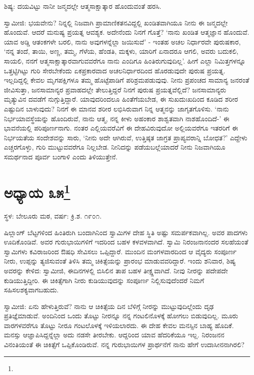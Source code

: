 ಶಿಷ್ಯ: ದಯವಿಟ್ಟು ನಾನೀ ಜನ್ಮದಲ್ಲೇ ಆತ್ಮಸಾಕ್ಷಾತ್ಕಾರ ಹೊಂದುವಂತೆ ಹರಸಿ.

ಸ್ವಾಮೀಜಿ: ಭಯವೇನು? ನಿನ್ನಲ್ಲಿ ನಿಜವಾಗಿ ಪ್ರಾಮಾಣಿಕತನವಿದ್ದಲ್ಲಿ ಖಂಡಿತವಾಗಿಯೂ ನೀನು ಈ ಜನ್ಮದಲ್ಲೇ ಹೊಂದುವೆ. ಆದರೆ ಮನುಷ್ಯ ಪ್ರಯತ್ನ ಆವಶ್ಯಕ. ಅದೇನೆಂದು ನಿನಗೆ ಗೊತ್ತೆ? ‘ನಾನು ಖಂಡಿತ ಆತ್ಮಜ್ಞಾನ ಹೊಂದುವೆ. ಯಾವ ಅಡ್ಡಿ ಆತಂಕಗಳೇ ಬರಲಿ, ನಾನು ಅವುಗಳನ್ನೆಲ್ಲಾ ಜಯಿಸುವೆ’ - ಇಂತಹ ಅಚಲ ನಿರ್ಧಾರವೇ ಪುರುಷಕಾರ, ‘ನನ್ನ ತಂದೆ, ತಾಯಿ, ಅಣ್ಣ, ತಮ್ಮ, ಗೆಳೆಯ, ಹೆಂಡತಿ, ಮಕ್ಕಳು, ಯಾರಿಗೆ ಏನಾದರೂ ಆಗಲಿ, ಅವರು ಬದುಕಲಿ, ಸಾಯಲಿ, ನನಗೆ ಆತ್ಮಸಾಕ್ಷಾತ್ಕಾರವಾಗುವವರೆಗೂ ನಾನು ಎಂದಿಗೂ ಹಿಂತಿರುಗುವುದಿಲ್ಲ’. ಹೀಗೆ ಎಲ್ಲಾ ನಿಮಿತ್ತಗಳನ್ನೂ ಒತ್ತಟ್ಟಿಗಿಟ್ಟು ಗುರಿ ಸೇರಬೇಕೆಂದು ಏಕಪ್ರಕಾರವಾದ ಅಚಲನಿರ್ಧಾರದಿಂದ ಹೊರಡುವುದೇ ಪುರುಷ ಪ್ರಯತ್ನ. ಇಲ್ಲದಿದ್ದಲ್ಲಿ ಕೇವಲ ಮೃಗಪಕ್ಷಿಗಳೂ ತಮ್ಮ ಹೊಟ್ಟೆಪಾಡಿಗೆ ಪರಿಶ್ರಮಪಡುವುವು. ನೀನು ಪ್ರಪಂಚದ ಸಾಮಾನ್ಯ ಜನರಂತೆ ಜೀವಿಸುತ್ತಾ, ಜನಸಾಮಾನ್ಯರ ಪ್ರವಾಹದಲ್ಲೇ ತೇಲುತ್ತಿದ್ದರೆ ನಿನಗೆ ಪುರುಷ ಪ್ರಯತ್ನವೆಲ್ಲಿದೆ? ಜನಸಾಮಾನ್ಯರು ಮೃತ್ಯುವಿನ ದವಡೆಗೆ ನುಗ್ಗುತ್ತಿದ್ದಾರೆ. ಯಾವುದರಿಂದಲೂ ಹಿಂತೆಗೆಯಬೇಡ, ಈ ಸುಖದುಃಖದಿಂದ ಕೂಡಿದ ಶರೀರ ಎಷ್ಟುದಿನ ಬಾಳುವುದು? ನಿನಗೆ ಈ ಮಾನವ ಶರೀರ ಲಭಿಸಿರುವಾಗ ನಿನ್ನ ಆತ್ಮನನ್ನು ಜಾಗೃತಗೊಳಿಸು. ‘ನಾನು ನಿರ್ಭಯಾವಸ್ಥೆಯನ್ನು ಹೊಂದಿರುವೆ, ನಾನು ಆತ್ಮ, ನನ್ನ ಕೀಳು ಅಹಂಕಾರ ಶಾಶ್ವತವಾಗಿ ನಾಶಹೊಂದಿದೆ-’ ಈ ಭಾವನೆಯಲ್ಲಿ ಪರಿಪೂರ್ಣನಾಗು. ನಂತರ ಎಲ್ಲಿಯವರೆವಿಗೆ ಈ ದೇಹವಿರುವುದೋ ಅಲ್ಲಿಯವರೆಗೂ ಇತರರಿಗೆ ಈ ನಿರ್ಭಯತೆಯ ಸಂದೇಶವನ್ನು ಸಾರು, ‘ನೀನು ಅದೇ ಆಗಿರುವೆ, ಉತ್ತಿಷ್ಠತ ಜಾಗ್ರತ ಪ್ರಾಪ್ಯವರಾನ್ನಿ ಬೋಧತ?’ ಎದ್ದೇಳು ಎಚ್ಚರಗೊಳ್ಳು, ಗುರಿ ಮುಟ್ಟುವವರೆಗೂ ನಿಲ್ಲಬೇಡ. ನೀನಿದನ್ನು ಪಡೆಯಬಲ್ಲೆಯಾದರೆ ನೀನು ನಿಜವಾಗಿಯೂ ಸಮರ್ಥನಾದ ಪೂರ್ವ ಬಂಗಾಳಿ ಎಂದು ತಿಳಿಯುತ್ತೇನೆ.

\newpage

\chapter[ಅಧ್ಯಾಯ ೩೫]{ಅಧ್ಯಾಯ ೩೫\protect\footnote{}}

\begin{center}
ಸ್ಥಳ: ಬೇಲೂರು ಮಠ, ವರ್ಷ: ಕ್ರಿ.ಶ. ೧೯೦೧.
\end{center}

ಷಿಲ್ಲಾಂಗ್ ಬೆಟ್ಟಗಳಿಂದ ಹಿಂತಿರುಗಿ ಬಂದಾಗಿನಿಂದ ಸ್ವಾಮಿಗಳ ದೇಹ ಸ್ಥಿತಿ ಅಷ್ಟು ಸಮರ್ಪಕವಾಗಿಲ್ಲ. ಅವರ ಪಾದಗಳು ಊದಿಕೊಂಡಿವೆ. ಅವರ ಗುರುಭಾಯಿಗಳಿಗೆ ಇದರಿಂದ ಬಹಳ ಕಳವಳವಾಗಿದೆ. ಸ್ವಾಮಿ ನಿರಂಜನಾನಂದರ ಸಲಹೆಯಂತೆ ಸ್ವಾಮಿಗಳು ಕವಿರಾಜರಿಂದ ಔಷಧಿ ಸೇವಿಸಲು ಒಪ್ಪಿದ್ದಾರೆ. ಮುಂದಿನ ಮಂಗಳವಾರದಿಂದ ಆ ವೈದ್ಯರು ಸಂಪೂರ್ಣ ನೀರು, ಉಪ್ಪನ್ನು ತ್ಯಜಿಸುವಂತೆ ತಿಳಿಸಿ ತಮ್ಮ ಚಿಕಿತ್ಸೆಯನ್ನು ಪ್ರಾರಂಭ ಮಾಡುವವರಿದ್ದಾರೆ. ಇಂದು ಶನಿವಾರ, ಶಿಷ್ಯ ಅವರನ್ನು ಕೇಳಿದ: ಸ್ವಾಮೀಜಿ, ಈದಿನಗಳಲ್ಲಿ ಬಿಸಿಲಿನ ತಾಪ ಬಹಳ ತೀಕ್ಷ್ಣವಾಗಿದೆ. ನೀವು ನೀರನ್ನು ಪದೇಪದೇ ಕುಡಿಯುತ್ತಿದ್ದೀರಿ. ಈ ಚಿಕಿತ್ಸೆಗಾಗಿ ನೀರು ಕುಡಿಯುವುದನ್ನು ಸಂಪೂರ್ಣ ನಿಲ್ಲಿಸುವುದೆಂದರೆ ನಿಮಗೆ ಸಹಿಸಲಶಕ್ಯವಾಗಬಹುದು.

ಸ್ವಾಮೀಜಿ: ಏನು ಹೇಳುತ್ತಿರುವೆ? ನಾನು ಆ ಚಿಕಿತ್ಸೆಯ ದಿನ ಬೆಳಿಗ್ಗೆ ನೀರನ್ನು ಮುಟ್ಟುವುದಿಲ್ಲೆಂದು ದೃಢ ಪ್ರತಿಜ್ಞೆಮಾಡುವೆ. ಅಂದಿನಿಂದ ಒಂದು ತೊಟ್ಟು ನೀರನ್ನೂ ನನ್ನ ಗಂಟಲಿನೊಳಕ್ಕೆ ಹೋಗಲು ಬಿಡುವುದಿಲ್ಲ. ಮೂರು ವಾರಗಳವರೆಗೂ ತೊಟ್ಟು ನೀರೂ ಗಂಟಲೊಳಕ್ಕೆ ಇಳಿಯಲಾರದು. ಈ ದೇಹ ಕೇವಲ ಮನಸ್ಸಿನ ಬಾಹ್ಯ ಹೊದಿಕೆ. ಮನಸ್ಸು ಆಜ್ಞಾಪಿಸಿದ್ದನ್ನೆಲ್ಲಾ ಅದು ನಡಸೇ ತೀರಬೇಕು. ಆದ್ದರಿಂದ ಯಾವ ಹೆದರಿಕೆಯೂ ಇಲ್ಲ. ನಿರಂಜನನ ವಿನಂತಿಯಂತೆ ಈ ಚಿಕಿತ್ಸೆಗೆ ಒಪ್ಪಿಕೊಂಡಿರುವೆ. ನನ್ನ ಗುರುಭಾಯಿಗಳ ಪ್ರಾರ್ಥನೆಗೆ ನಾನು ಹೇಗೆ ಉದಾಸೀನನಾಗಿರಲಿ?

